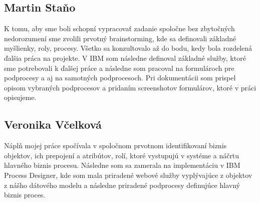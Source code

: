 \documentclass[10pt,oneside,slovak,a4paper]{article}
\begin{document}
\subsection{Martin Staňo}
K tomu, aby sme boli schopní vypracovať zadanie spoločne bez zbytočných nedorozumení sme zvolili prvotný brainstorming, kde sa definovali základné myšlienky, roly, procesy. Všetko sa konzultovalo až do bodu, kedy bola rozdelená ďalšia práca na projekte. V IBM som následne definoval základné služby, ktoré sme potrebovali k ďalšej práce a následne som pracoval na formulároch pre podprocesy a aj na samotných podprocesoch. Pri dokumentácii som prispel opisom vybraných podprocesov a pridaním screenshotov formulárov, ktoré v práci opisujeme.
\subsection{Veronika Včelková}
Náplň mojej práce spočívala v spoločnom prvotnom identifikovaní biznis objektov, ich prepojení a atribútov, rolí, ktoré vystupujú v systéme a náčrtu hlavného biznis procesu. Následne som sa zamerala na implementáciu v IBM Process Designer, kde som mala priradené webové služby vyplývajúce z objektov z nášho dátového modelu a následne priradené podprocesy definujúce hlavný biznis proces.
\end{document}
